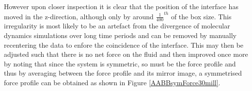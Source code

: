 However upon closer inspection it is clear that the position of the interface has moved in the z-direction, although only by around $\frac{1}{400}^{th}$ of the box size. 
This irregularity is most likely to be an artefact from the divergence of molecular dynamics simulations over long time periods and can be removed by manually recentering the data to enfore the coincidence of the interface.
This may then be adjusted such that there is no net force on the fluid and then improved once more by noting that since the system is symmetric, so must be the force profile and thus by averaging between the force profile and its mirror image, a symmetrised force profile can be obtained as shown in Figure \ref{AABBsymForce30mill}.

